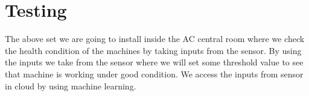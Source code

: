 \section{Testing}
The above set we are going to install inside the AC central room where we check the health condition of the machines by taking inputs from the sensor. By using the inputs we take from the sensor where we will set some threshold value to see that machine is working under good condition. We access the inputs from sensor in cloud by using machine learning.






